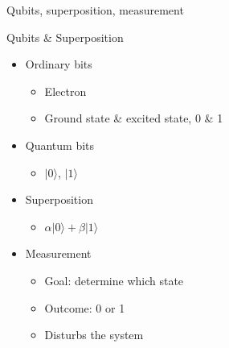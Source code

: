 \begin{frame}{Qubits, superposition, measurement}

\begin{block}{Qubits \& Superposition}

\begin{itemize}
\itemsep1pt\parskip0pt
\item
  Ordinary bits

  \begin{itemize}
  \itemsep1pt\parskip0pt
  \item
    Electron
  \item
    Ground state \& excited state, 0 \& 1
  \end{itemize}
\item
  Quantum bits

  \begin{itemize}
  \itemsep1pt\parskip0pt
  \item
    $|0 \rangle$, $|1 \rangle$
  \end{itemize}
\item
  Superposition

  \begin{itemize}
  \itemsep1pt\parskip0pt
  \item
    $\alpha |0 \rangle + \beta |1 \rangle$
  \end{itemize}
\item
  Measurement

  \begin{itemize}
  \itemsep1pt\parskip0pt
  \item
    Goal: determine which state
  \item
    Outcome: 0 or 1
  \item
    Disturbs the system
  \end{itemize}
\end{itemize}

\end{block}

\end{frame}

